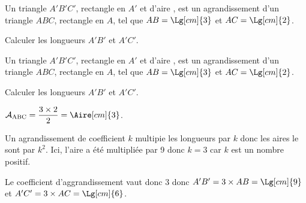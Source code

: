 \begin{exercice*}
    Un triangle $A'B'C'$, rectangle en $A'$ et d'aire , est un agrandissement d'un triangle $ABC$, rectangle en $A$, tel que $AB = \Lg[cm]{3}$ et $AC = \Lg[cm]{2}$.

    Calculer les longueurs $A'B'$ et $A'C'$.
\end{exercice*}
\begin{corrige}
    Un triangle $A'B'C'$, rectangle en $A'$ et d'aire , est un agrandissement d'un triangle $ABC$, rectangle en $A$, tel que $AB = \Lg[cm]{3}$ et $AC = \Lg[cm]{2}$.

    Calculer les longueurs $A'B'$ et $A'C'$.

    {\color{red}$\mathcal{A}_\text{ABC}=\dfrac{3\times 2}{2}=\Aire[cm]{3}$.
    
    Un agrandissement de coefficient $k$ multipie les longueurs par $k$ donc les aires le sont par $k^2$. Ici, l'aire a été multipliée par 9 donc $k=3$ car $k$ est un nombre positif.
    
    Le coefficient d'aggrandissement vaut donc 3 donc $A'B'=3\times AB=\Lg[cm]{9}$ et $A'C'=3\times AC=\Lg[cm]{6}$.}
\end{corrige}
